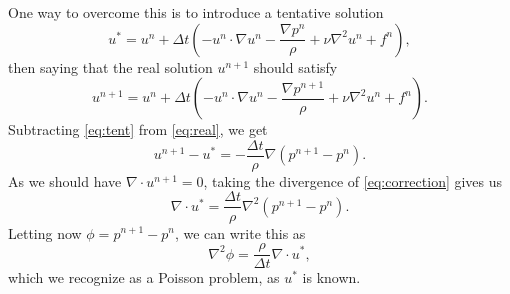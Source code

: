 One way to overcome this is to introduce a tentative solution
\begin{equation}\label{eq:tent}
    u^* = u^n + \Delta t \left(
        - u^n \cdot \nabla u^n
        -\frac{\nabla p^n}{\rho}
        + \nu \nabla^2 u^n
        + f^n
    \right),
\end{equation}
then saying that the real solution $u^{n+1}$ should satisfy
\begin{equation}\label{eq:real}
    u^{n + 1} = u^n + \Delta t \left(
        - u^n \cdot \nabla u^n
        -\frac{\nabla p^{n+1}}{\rho}
        + \nu \nabla^2 u^n
        + f^n
    \right).
\end{equation}
Subtracting \cref{eq:tent} from \cref{eq:real}, we get
\begin{equation}\label{eq:correction}
    u^{n + 1} - u^* = -\frac{\Delta t}{\rho} \nabla \left( p^{n+1} - p^n \right).
\end{equation}
As we should have $\nabla \cdot u^{n+1} = 0$, taking the divergence of \cref{eq:correction} gives us
\begin{equation}
    \nabla \cdot u^* = \frac{\Delta t}{\rho} \nabla^2 \left( p^{n + 1} - p^{n} \right).
\end{equation}
Letting now $\phi = p^{n + 1} - p^{n}$, we can write this as
\begin{equation}
    \nabla^2 \phi = \frac{\rho}{\Delta t} \nabla \cdot u^*,
\end{equation}
which we recognize as a Poisson problem, as $u^*$ is known.

